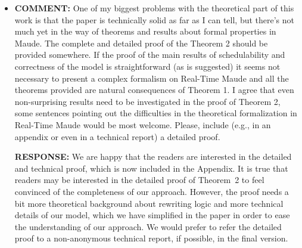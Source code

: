 \documentclass[10pt,journal]{IEEEtran}
\newcommand{\hide}[1]{\ignorespaces}
\newcommand{\ANSWER}{{\bf RESPONSE: }}
\newcommand{\COMMENT}{{\bf COMMENT: }}
\begin{document}
\begin{itemize}
\hide{
the modeled RMS implementation serves in an avionic control systems
from our industrial partner. It is a real-world application within the
field of industrial real-time systems. And the scenarios presented in
Section V.B are also real scenarios that our partner is using in the
system. Our partner indicated that there would be at most $5$ tasks in
the task set for the implementation. On the other hand, in the current
version, we have randomly generated large numbers of test cases to
examine the efficiency of our schedulability test that is based on
model checking, as discussed in Section V.B. The capability of model
checking is restricted by the scale of the state space of the
model. In our model, the model checking can handle scenarios where
$mn$ is up to $10^6$ in an acceptable period of time. With $mn=10^6$
and reasonable task periods, the number $n$ of tasks can be at least
$10$, which has already fulfilled the requirements of the target
implementation. Further with particular task periods, the number $n$
of tasks can be $20$ or more.
}

\item
\COMMENT One of my biggest problems with the theoretical part of this
work is that the paper is technically solid as far as I can tell, but
there's not much yet in the way of theorems and results about formal
properties in Maude. The complete and detailed proof of the Theorem 2
should be provided somewhere. If the proof of the main results of
schedulability and correctness of the model is straightforward (as is
suggested) it seems not necessary to present a complex formalism on
Real-Time Maude and all the theorems provided are natural consequences
of Theorem 1. I agree that even non-surprising results need to be
investigated in the proof of Theorem 2, some sentences pointing out
the difficulties in the theoretical formalization in Real-Time Maude
would be most welcome. Please, include (e.g., in an appendix or even
in a technical report) a detailed proof.

\ANSWER We are happy that the readers are interested in the detailed
and technical proof, which is now included in the Appendix. It is true
that readers may be interested in the detailed proof of Theorem~2 to
feel convinced of the completeness of our approach. However, the proof
needs a bit more theoretical background about rewriting logic and more
technical details of our model, which we have simplified in the paper
in order to ease the understanding of our approach. We would prefer to
refer the detailed proof to a non-anonymous technical report, if
possible, in the final version.


\end{itemize}
\end{document}
